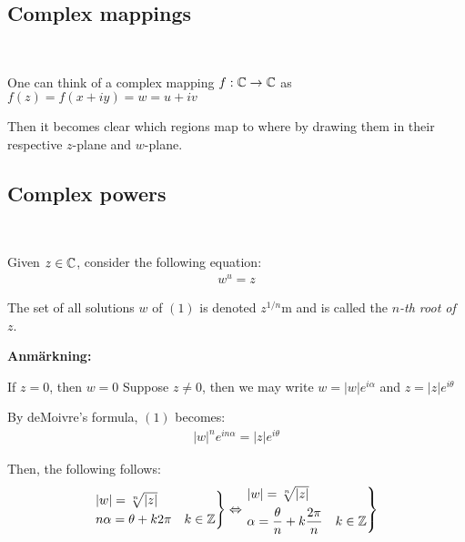 \subsection{Complex mappings}\hfill\\\par
\noindent One can think of a complex mapping $f:\mathbb{C}\to\mathbb{C}$ as $f(z) = f(x+iy)=w=u+iv$\par
\noindent Then it becomes clear which regions map to where by drawing them in their respective $z$-plane and $w$-plane.
\par\bigskip
\subsection{Complex powers}\hfill\\\par
\noindent Given $z\in\mathbb{C}$, consider the following equation:
\begin{equation}
  \begin{gathered}
    w^u = z
  \end{gathered}
\end{equation}
\par\bigskip
\noindent The set of all solutions $w$ of $(1)$ is denoted $z^{1/n}$m and is called the \textit{$n$-th root of $z$}.
\par\bigskip
\noindent\textbf{Anmärkning:}\par
\noindent If $z=0$, then $w=0$
\newpage
\noindent Suppose $z\neq0$, then we may write $w = \left|w\right|e^{i\alpha}$  and $z=\left|z\right|e^{i\theta}$\par
\noindent By deMoivre's formula, $(1)$ becomes:
\begin{equation*}
  \begin{gathered}
    \left|w\right|^ne^{in\alpha} = \left|z\right|e^{i\theta}
  \end{gathered}
\end{equation*}
\par\bigskip
\noindent Then, the following follows:
\begin{equation*}
  \begin{gathered}
    \begin{rcases*}
      \left|w\right|=\sqrt[n]{\left|z\right|}\\
      n\alpha = \theta+k2\pi\quad k\in\Z
    \end{rcases*}\Lrarr
    \begin{rcases*}
      \left|w\right|=\sqrt[n]{\left|z\right|}\\
      \alpha = \dfrac{\theta}{n}+k\dfrac{2\pi}{n}\quad k\in\Z
    \end{rcases*}
  \end{gathered}
\end{equation*}\par
